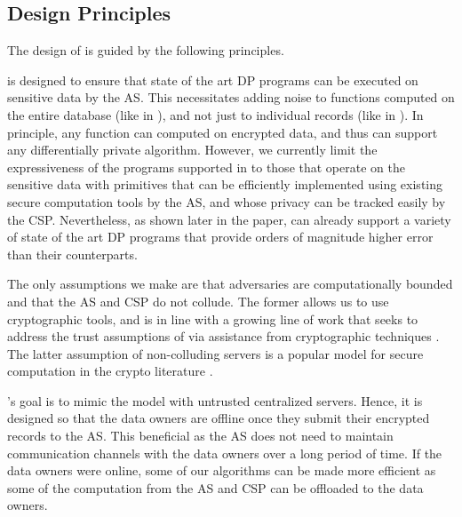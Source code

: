 \subsection{\system Design Principles}\label{sec:discuss-arch}
The design of \system is guided by the following principles. 

 \system is designed to ensure that state of the art DP programs can be executed on sensitive data by the \textsf{AS}. This necessitates adding noise to functions computed on the entire database (like in \cdp), and not just to individual records (like in \ldp). In principle, any function can computed on encrypted data, and thus \system can support any differentially private algorithm. However, we currently limit the expressiveness of the programs supported in \system to those that operate on the sensitive data with primitives that can be efficiently implemented using existing secure computation tools  by the \textsf{AS}, and whose privacy can be tracked easily by the \textsf{CSP}. Nevertheless, as shown later in the paper, \system can already support a variety of state of the art DP programs that provide orders of magnitude higher error than their \ldp counterparts. 

 The only assumptions we make are that adversaries are computationally bounded and that the \textsf{AS} and  \textsf{CSP} do not collude. The former allows us to use cryptographic tools, and is in line with a growing line of work that seeks to address the trust assumptions of \cdp via assistance from cryptographic techniques \cite{Prochlo,mixnets,amplification,Shi,Shi2,kamara,Rastogi}. The latter assumption of non-colluding servers is a popular model for secure computation in the crypto literature \cite{Boneh1,Boneh2,Ridge2,Matrix2,secureML,LReg,Ver}.  

 \system's goal is to mimic the \cdp model with untrusted centralized servers. Hence, it is designed so that the data owners are offline once they submit their encrypted records to the \textsf{AS}. This beneficial as the \textsf{AS} does not need to maintain communication channels with the data owners over a long period of time. If the data owners were online, some of our algorithms can be made more efficient as some of the computation from the \textsf{AS} and \textsf{CSP} can be offloaded to the data owners. 

